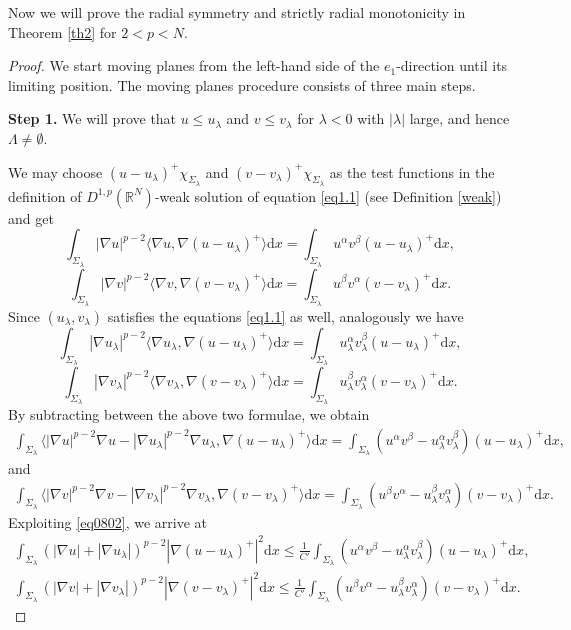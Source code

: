 \documentclass[12pt]{amsart}
\theoremstyle{definition}
\theoremstyle{remark}
\theoremstyle{conclusion}
\theoremstyle{conjecture}
\numberwithin{equation}{section}
\newcommand{\R}{\mathbb{R}}
\begin{document}
Now we will prove the radial symmetry and strictly radial monotonicity in Theorem \ref{th2} for $2<p<N$.
\begin{proof}
We start moving planes from the left-hand side of the $e_1$-direction until its limiting position. The moving planes procedure consists of three main steps.

\smallskip

{\bf Step 1.} We will prove that $u\leq u_\lambda$ and $v\leq v_\lambda$ for $\lambda<0$ with $|\lambda|$ large, and hence $\Lambda\neq\emptyset$.

\smallskip

We may choose $(u-u_\lambda)^+ \chi_{\Sigma_\lambda} $ and $(v-v_\lambda)^+ \chi_{\Sigma_\lambda} $ as the test functions in the definition of $D^{1,p}(\R^N)$-weak solution of equation \eqref{eq1.1} (see Definition \ref{weak}) and get
$$ \int_{\Sigma_\lambda} |\nabla u|^{p-2} \langle \nabla u,\nabla(u-u_\lambda)^+ \rangle \mathrm{d}x= \int_{\Sigma_\lambda} u^{\alpha}v^{\beta} (u-u_\lambda)^+  \mathrm{d}x,$$
$$ \int_{\Sigma_\lambda} |\nabla v|^{p-2} \langle \nabla v,\nabla(v-v_\lambda)^+ \rangle \mathrm{d}x= \int_{\Sigma_\lambda} u^{\beta}v^{\alpha} (v-v_\lambda)^+  \mathrm{d}x.$$
 Since $(u_\lambda, v_\lambda)$ satisfies the equations \eqref{eq1.1} as well, analogously we have
$$ \int_{\Sigma_\lambda} |\nabla u_\lambda|^{p-2} \langle \nabla u_\lambda,\nabla(u-u_\lambda)^+ \rangle \mathrm{d}x= \int_{\Sigma_\lambda} u^{\alpha}_{\lambda}v^{\beta}_{\lambda} (u-u_\lambda)^+  \mathrm{d}x,$$
$$ \int_{\Sigma_\lambda} |\nabla v_\lambda|^{p-2} \langle \nabla v_\lambda,\nabla(v-v_\lambda)^+ \rangle \mathrm{d}x= \int_{\Sigma_\lambda} u^{\beta}_{\lambda}v^{\alpha}_{\lambda} (v-v_\lambda)^+  \mathrm{d}x.$$
By subtracting between the above two formulae, we obtain
\begin{align}\label{eq.mpm.u}
\int_{\Sigma_\lambda}  \langle  |\nabla u|^{p-2}\nabla u- |\nabla u_\lambda|^{p-2}\nabla u_\lambda,\nabla(u-u_\lambda)^+ \rangle \mathrm{d}x= \int_{\Sigma_\lambda} ( u^\alpha v^\beta -u^{\alpha}_{\lambda}v^{\beta}_{\lambda} ) (u-u_\lambda)^+  \mathrm{d}x,
\end{align}
and
\begin{align}\label{eq.mpm.v}
\int_{\Sigma_\lambda}  \langle  |\nabla v|^{p-2}\nabla v- |\nabla v_\lambda|^{p-2}\nabla v_\lambda,\nabla(v-v_\lambda)^+ \rangle \mathrm{d}x= \int_{\Sigma_\lambda} ( u^\beta v^\alpha -u^{\beta}_{\lambda}v^{\alpha}_{\lambda} ) (v-v_\lambda)^+  \mathrm{d}x.
\end{align}
Exploiting \eqref{eq0802}, we arrive at
\begin{align}\label{eq0803}
\int_{\Sigma_\lambda} (|\nabla u|+|\nabla u_\lambda|)^{p-2} |\nabla(u-u_\lambda)^+|^2 \mathrm{d}x \leq \frac{1}{C'} \int_{\Sigma_\lambda} (u^\alpha v^\beta -u^{\alpha}_{\lambda}v^{\beta}_{\lambda} ) (u-u_\lambda)^+  \mathrm{d}x,
\end{align}
\begin{align}\label{eq0803-}
    \int_{\Sigma_\lambda} (|\nabla v|+|\nabla v_\lambda|)^{p-2} |\nabla(v-v_\lambda)^+|^2 \mathrm{d}x \leq \frac{1}{C'} \int_{\Sigma_\lambda} (u^\beta v^\alpha -u^{\beta}_{\lambda}v^{\alpha}_{\lambda} ) (v-v_\lambda)^+  \mathrm{d}x.
\end{align}


\end{proof}
\end{document}

